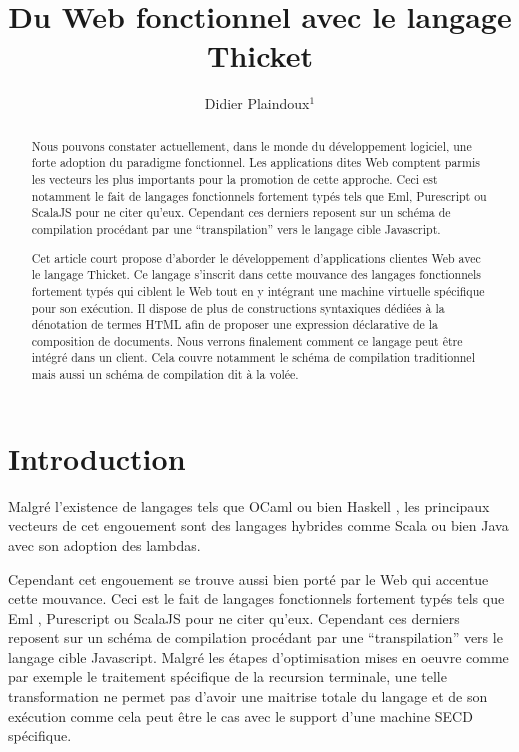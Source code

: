 \documentclass[twoside,a4paper]{article}
\title{ Du Web fonctionnel avec le langage Thicket }
\author{Didier Plaindoux$^1$}
\affiliation{\begin{tabular}{rr} 
    \\ 1:  Fungus, Le village 31430 Gratens, France
    \\     {\tt d.plaindoux@fungus.fr}
\end{tabular}}
\begin{document}
\setcounter{page}{1}
\maketitle

\begin{abstract}
Nous pouvons  constater actuellement,  dans le monde  du développement
logiciel,   une  forte   adoption   du   paradigme  fonctionnel.   Les
applications  dites   Web  comptent  parmis  les   vecteurs  les  plus
importants pour la promotion de  cette approche. Ceci est notamment le
fait de langages fonctionnels fortement typés tels que Eml, Purescript
ou ScalaJS pour  ne citer qu’eux. Cependant ces  derniers reposent sur
un schéma  de compilation  procédant par  une “transpilation”  vers le
langage cible Javascript.

Cet article  court propose  d'aborder le  développement d'applications
clientes Web avec le langage  Thicket. Ce langage s’inscrit dans cette
mouvance des langages fonctionnels fortement  typés qui ciblent le Web
tout  en  y  intégrant  une  machine  virtuelle  spécifique  pour  son
exécution. Il dispose  de plus de constructions  syntaxiques dédiées à
la  dénotation  de  termes  HTML   afin  de  proposer  une  expression
déclarative de  la composition  de documents. Nous  verrons finalement
comment  ce langage  peut être  intégré  dans un  client. Cela  couvre
notamment le schéma  de compilation traditionnel mais  aussi un schéma
de compilation dit à la volée.
\end{abstract}

\section{Introduction}

Malgré l'existence  de langages  tels que  OCaml \cite{ocaml}  ou bien
Haskell \cite{haskell}, les principaux vecteurs de cet engouement sont
des  langages   hybrides  comme   Scala  \cite{scala}  ou   bien  Java
\cite{java8} avec son adoption des lambdas.

Cependant cet  engouement se trouve  aussi bien  porté par le  Web qui
accentue cette  mouvance. Ceci  est le  fait de  langages fonctionnels
fortement typés tels que  Eml \cite{elm}, Purescript \cite{purescript}
ou ScalaJS \cite{scalajs} pour ne citer qu’eux. Cependant ces derniers
reposent   sur   un   schéma   de  compilation   procédant   par   une
“transpilation” vers  le langage  cible Javascript. Malgré  les étapes
d’optimisation  mises  en  oeuvre  comme  par  exemple  le  traitement
spécifique  de la  recursion  terminale, une  telle transformation  ne
permet pas d’avoir une maitrise totale  du langage et de son exécution
comme  cela peut  être  le  cas avec  le  support  d’une machine  SECD
spécifique.
\end{document}
